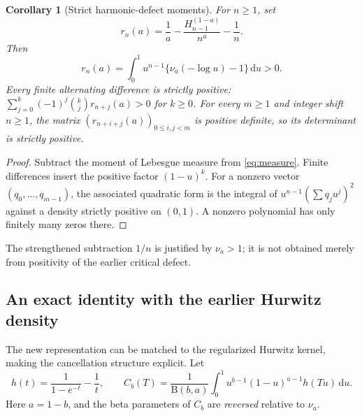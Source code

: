 \documentclass[11pt]{article}
\numberwithin{equation}{section}
\newtheorem{corollary}[theorem]{Corollary}
\theoremstyle{definition}\newtheorem{definition}[theorem]{Definition}
\theoremstyle{remark}\newtheorem{remark}[theorem]{Remark}
\newcommand{\dd}{\,\mathrm d}
\newcommand{\BB}{\mathrm B}
\begin{document}
\begin{corollary}[Strict harmonic-defect moments]\label{cor:defects}
For $n\ge1$, set
\begin{equation}\label{eq:defects}
 r_n(a)=\frac1a-\frac{H_{n-1}^{(1-a)}}{n^a}-\frac1n.
\end{equation}
Then
\begin{equation}\label{eq:defectmoments}
 r_n(a)=\int_0^1u^{n-1}\{\nu_a(-\log u)-1\}\dd u>0.
\end{equation}
Every finite alternating difference is strictly positive:
$\sum_{j=0}^k(-1)^j\binom kjr_{n+j}(a)>0$ for $k\ge0$.
For every $m\ge1$ and integer shift $n\ge1$, the matrix
$(r_{n+i+j}(a))_{0\le i,j<m}$ is positive definite, so its determinant
is strictly positive.
\end{corollary}
\begin{proof}
Subtract the moment of Lebesgue measure from \eqref{eq:measure}.
Finite differences insert the positive factor $(1-u)^k$.
For a nonzero vector $(q_0,\ldots,q_{m-1})$, the associated quadratic
form is the integral of
$u^{n-1}(\sum q_j u^j)^2$ against a density strictly positive on
$(0,1)$. A nonzero polynomial has only finitely many zeros there.
\end{proof}
The strengthened subtraction $1/n$ is justified by
$\nu_a>1$; it is not obtained merely from positivity of the earlier
critical defect.

\subsection{An exact identity with the earlier Hurwitz density}
The new representation can be matched to the regularized Hurwitz
kernel, making the cancellation structure explicit.
Let
\[
 h(t)=\frac1{1-e^{-t}}-\frac1t,\qquad
 C_b(T)=\frac1{\BB(b,a)}\int_0^1 u^{b-1}(1-u)^{a-1}h(Tu)\dd u.
\]
Here $a=1-b$, and the beta parameters of $C_b$ are \emph{reversed}
relative to $\nu_a$.
\end{document}
